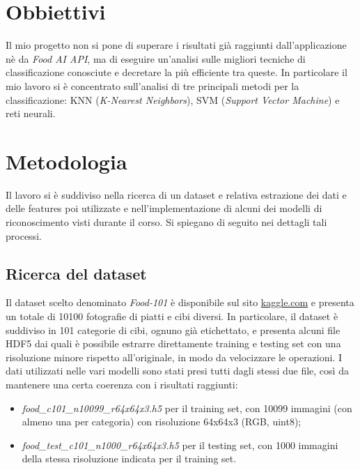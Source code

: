 \documentclass[11pt, a4paper, titlepage]{article}
\begin{document}
\section{Obbiettivi}
Il mio progetto non si pone di superare i risultati già raggiunti dall'applicazione nè da \textit{Food AI API}, ma di eseguire un'analisi sulle migliori tecniche di classificazione conosciute e decretare la più efficiente tra queste. In particolare il mio lavoro si è concentrato sull'analisi di tre principali metodi per la classificazione: KNN (\textit{K-Nearest Neighbors}), SVM (\textit{Support Vector Machine}) e reti neurali. 

\pagebreak

\section{Metodologia}
Il lavoro si è suddiviso nella ricerca di un dataset e relativa estrazione dei dati e delle features poi utilizzate e nell'implementazione di alcuni dei modelli di riconoscimento visti durante il corso. Si spiegano di seguito nei dettagli tali processi. 

\subsection{Ricerca del dataset}
Il dataset scelto denominato \emph{Food-101} \cite{food-101} è disponibile sul sito \url{kaggle.com} e presenta un totale di 10100 fotografie di piatti e cibi diversi. In particolare, il dataset è suddiviso in 101 categorie di cibi, ognuno già etichettato, e presenta alcuni file HDF5 dai quali è possibile estrarre direttamente training e testing set con una risoluzione minore rispetto all'originale, in modo da velocizzare le operazioni. I dati utilizzati nelle vari modelli sono stati presi tutti dagli stessi due file, così da mantenere una certa coerenza con i risultati raggiunti:
\begin{itemize}
    \item \textit{food\_c101\_n10099\_r64x64x3.h5} per il training set, con 10099 immagini (con almeno una per categoria) con risoluzione 64x64x3 (RGB, uint8);
    \item \textit{food\_test\_c101\_n1000\_r64x64x3.h5} per il testing set, con 1000 immagini della stessa risoluzione indicata per il training set. 
\end{itemize}
 

\pagebreak
{}

\end{document}
